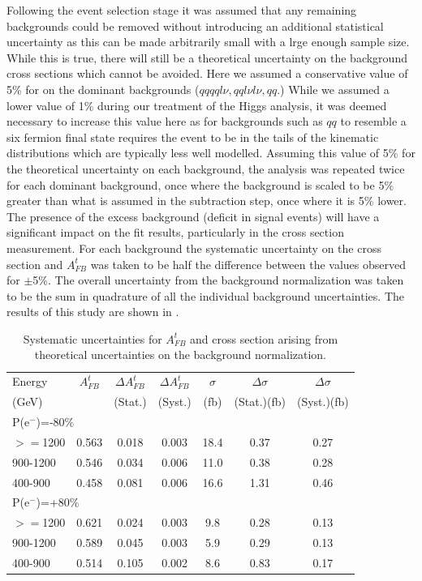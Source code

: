 Following the event selection stage it was assumed that any remaining backgrounds could be removed without introducing an additional statistical uncertainty as this can be made arbitrarily small with a lrge enough sample size. While this is true, there will still be a theoretical uncertainty on the background cross sections which cannot be avoided. Here we assumed a conservative value of 5\% for on the dominant backgrounds ($qqqql\nu, qql\nu l\nu,qq$.) While we assumed a lower value of 1\% during our treatment of the Higgs analysis, it was deemed necessary to increase this value here as for backgrounds such as $qq$ to resemble a six fermion final state requires the event to be in the tails of the kinematic distributions which are typically less well modelled. Assuming this value of 5\% for the theoretical uncertainty on each background, the analysis was repeated twice for each dominant background, once where the background is scaled to be 5\% greater than what is assumed in the subtraction step, once where it is 5\% lower. The presence of the excess background (\/deficit in signal events) will have a significant impact on the fit results, particularly in the cross section measurement. For each background the systematic uncertainty on the cross section and $A_{FB}^t$ was taken to be half the difference between the values observed for $\pm$5\%. The overall uncertainty from the background normalization was taken to be the sum in quadrature of all the individual background uncertainties. The results of this study are shown in .

\begin{table}
  \centering
  \begin{tabular}{l|c|c|c|c|c|c}
    \toprule
     Energy & $A_{FB}^t$ & $\Delta A_{FB}^t$  & $\Delta A^t_{FB}$ &  $\sigma$  &  $\Delta\sigma$  &  $\Delta\sigma$ \\
     (GeV) &  & (Stat.) & (Syst.) &  (fb) &  (Stat.)(fb) &  (Syst.)(fb)\\
     \midrule
     \midrule
     \multicolumn{7}{l}{P(e$^-$)=-80\%} \\
     \midrule
     \midrule
    $>=$1200   & 0.563 & 0.018 & 0.003 & 18.4 & 0.37 & 0.27\\
    \midrule
    900-1200   & 0.546 & 0.034 & 0.006 & 11.0 & 0.38 & 0.28\\
    \midrule
    400-900    & 0.458 & 0.081 & 0.006 & 16.6 & 1.31 & 0.46\\
    \midrule
    \midrule
   \multicolumn{7}{l}{ P(e$^-$)=+80\%}\\
    \midrule
    \midrule
    $>=$1200  & 0.621 & 0.024 & 0.003 & 9.8 & 0.28 & 0.13 \\
    \midrule
    900-1200  & 0.589 & 0.045 & 0.003 & 5.9 & 0.29 & 0.13 \\
    \midrule
    400-900   & 0.514 & 0.105 & 0.002 & 8.6 & 0.83 & 0.17 \\
    \bottomrule
  \end{tabular}
  \caption{Systematic uncertainties for $A_{FB}^t$ and cross section arising from theoretical uncertainties on the background normalization.}
  \label{tab:bkgnorm}
\end{table}

